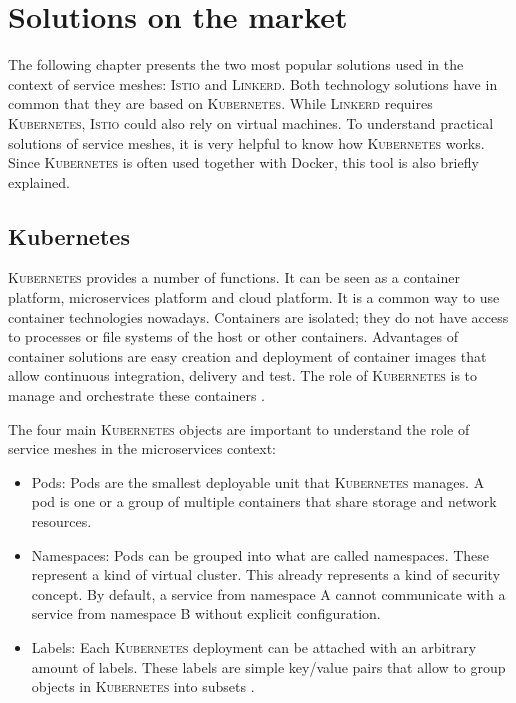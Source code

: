 \section{Solutions on the market}

The following chapter presents the two most popular solutions used in the context of service meshes: \textsc{Istio} and \textsc{Linkerd}. Both technology solutions have in common that they are based on \textsc{Kubernetes}. While \textsc{Linkerd} requires \textsc{Kubernetes}, \textsc{Istio} could also rely on virtual machines. To understand practical solutions of service meshes, it is very helpful to know how \textsc{Kubernetes} works. Since \textsc{Kubernetes} is often used together with Docker, this tool is also briefly explained.

\subsection{Kubernetes}

\textsc{Kubernetes} provides a number of functions. It can be seen as a container platform, microservices platform and cloud platform.
It is a common way to use container technologies nowadays. Containers are isolated; they do not have access to processes or file systems of the host or other containers.
Advantages of container solutions are easy creation and deployment of container images that allow continuous integration, delivery and test. The role of \textsc{Kubernetes} is to manage and orchestrate these containers \cite{k8s}.

The four main \textsc{Kubernetes} objects are important to understand the role of service meshes in the microservices context:
\begin{itemize}
\item Pods: Pods are the smallest deployable unit that \textsc{Kubernetes} manages. A pod is one or a group of multiple containers that share storage and network resources.
\item Namespaces: Pods can be grouped into what are called namespaces. These represent a kind of virtual cluster. This already represents a kind of security concept. By default, a service from namespace A cannot communicate with a service from namespace B without explicit configuration.
\item Labels: Each \textsc{Kubernetes} deployment can be attached with an arbitrary amount of labels. These labels are simple key/value pairs that allow to group objects in \textsc{Kubernetes} into subsets \cite{k8s}.
\end{itemize}

